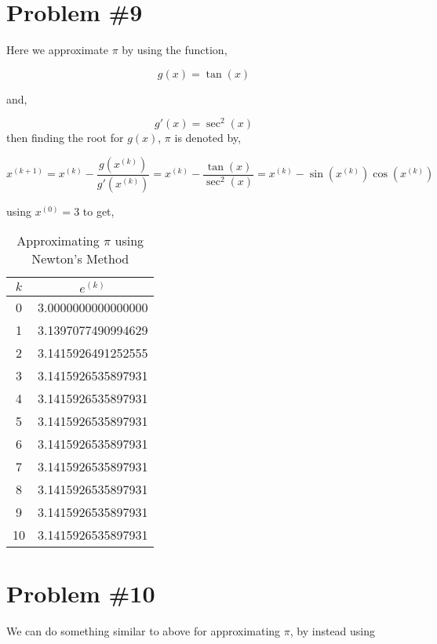 \documentclass{article}
\begin{document}
\section*{Problem \#9}

Here we approximate $\pi$ by using the function,

\begin{equation*}
    g(x) = \tan(x)
\end{equation*}

and,

\begin{equation*}
    g'(x) = \sec^2(x)
\end{equation*}
then finding the root for $g(x)$, $\pi$ is denoted by,

\begin{equation*}
    x^{(k+1)} = x^{(k)} - \frac{g(x^{(k)})}{g'(x^{(k)})} = x^{(k)} - \frac{\tan(x)}{ \sec^2(x)} = x^{(k)} - \sin(x^{(k)})\cos(x^{(k)})
\end{equation*}

using $x^{(0)} = 3$ to get,

\begin{table}[H]
    \centering
    \begin{tabular}{c|c}
        $k$ &  $e^{(k)}$ \\
        \hline{} 0 &  3.0000000000000000\\
        1 & 3.1397077490994629\\
        2 & 3.1415926491252555\\
        3 & 3.1415926535897931\\
        4 & 3.1415926535897931 \\
        5 & 3.1415926535897931\\
        6 &  3.1415926535897931
\\
        7 & 3.1415926535897931\\
        8 & 3.1415926535897931\\
        9 &3.1415926535897931\\
        10 &3.1415926535897931
        
    \end{tabular}
    \caption{Approximating $\pi$ using Newton's Method}
    \label{tab:my_label}
\end{table}

\section*{Problem \#10}
We can do something similar to above for approximating $\pi$, by instead using
\end{document}
